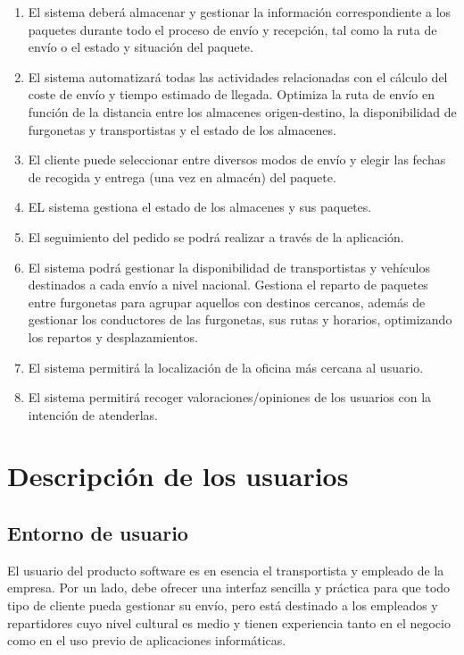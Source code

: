 \begin{enumerate}
	\item El sistema deberá almacenar y gestionar la información correspondiente a los paquetes durante todo el proceso de envío y recepción, tal como la ruta de envío o el estado y situación del paquete.
	\item El sistema automatizará todas las actividades relacionadas con el cálculo del coste de envío y tiempo estimado de llegada. Optimiza la ruta de envío en función de la distancia entre los almacenes origen-destino, la disponibilidad de furgonetas y transportistas y el estado de los almacenes.
	\item El cliente puede seleccionar entre diversos modos de envío y elegir las fechas de recogida y entrega (una vez en almacén) del paquete.
	\item EL sistema gestiona el estado de los almacenes y sus paquetes.
	\item El seguimiento del pedido se podrá realizar a través de la aplicación.
	\item El sistema podrá gestionar la disponibilidad de transportistas y vehículos destinados a cada envío a nivel nacional. Gestiona el reparto de paquetes entre furgonetas para agrupar aquellos con destinos cercanos, además de gestionar los conductores de las furgonetas, sus rutas y horarios, optimizando los repartos y desplazamientos.
	\item El sistema permitirá la localización de la oficina más cercana al usuario.
	\item El sistema permitirá recoger valoraciones/opiniones de los usuarios con la intención de atenderlas.\\
	 
\end{enumerate}

\newpage

\section{Descripción de los usuarios}
	\subsection{Entorno de usuario}
		El usuario del producto software es en esencia el transportista y empleado de la empresa. Por un lado, debe ofrecer una interfaz sencilla y práctica para que todo tipo de cliente pueda gestionar su envío, pero está destinado a los empleados y repartidores cuyo nivel cultural es medio y tienen experiencia tanto en el negocio como en el uso previo de aplicaciones informáticas.
	

